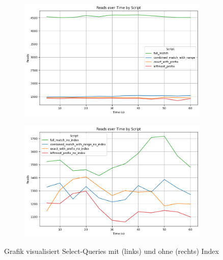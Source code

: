 \vspace{-8pt}
\begin{figure}[H]
    \centering
    \begin{subfigure}[t]{0.48\textwidth}
        \centering
        \includegraphics[width=\textwidth]{PNGs/Script/Index/Hash/hash-query-differences/Reads}
    \end{subfigure}
    \hfill
    \begin{subfigure}[t]{0.48\textwidth}
        \centering
        \includegraphics[width=\textwidth]{PNGs/Script/Index/Hash/hash-query-differences-no-index/Reads}
    \end{subfigure}
    \vspace{-8pt}
    \caption[Hash-Indexing: Unterschiedliche Abfragen mit Index und Ohne]{Grafik visualisiert Select-Queries mit (links) und ohne (rechts) Index}
    \label{fig:indexing-hash-query-reads}
\end{figure}

